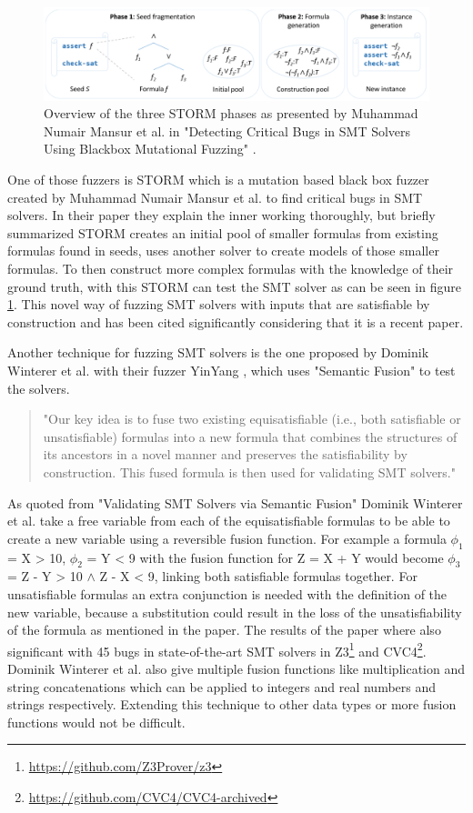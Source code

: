 \begin{figure}
	\centering
	\includegraphics[width=1.0\textwidth]{images/STORM}
	\caption{Overview of the three STORM phases as presented by Muhammad Numair Mansur et al. in "Detecting Critical Bugs in SMT Solvers Using Blackbox Mutational Fuzzing" \cite{1mansur2020detecting}.}
	\label{fig:STORM}
\end{figure}
One of those fuzzers is STORM which is a mutation based black box fuzzer created by Muhammad Numair Mansur et al. \cite{1mansur2020detecting} to find critical bugs in SMT solvers. In their paper they explain the inner working thoroughly, but briefly summarized STORM creates an initial pool of smaller formulas from existing formulas found in seeds, uses another solver to create models of those smaller formulas. To then construct more complex formulas with the knowledge of their ground truth, with this STORM can test the SMT solver as can be seen in figure \ref{fig:STORM}. This novel way of fuzzing SMT solvers with inputs that are satisfiable by construction and has been cited significantly considering that it is a recent paper.


Another technique for fuzzing SMT solvers is the one proposed by Dominik Winterer et al. with their fuzzer YinYang \cite{43YinYang}, which uses "Semantic Fusion" to test the solvers.
\begin{quote}
	\label{quote:Fuzzing:YinYang}
	"Our key idea is to fuse two existing equisatisfiable (i.e., both satisfiable or unsatisfiable) formulas into a new formula that combines the structures of its ancestors in a novel manner and preserves the satisfiability by construction. This fused formula is then used for validating SMT solvers."
\end{quote} As quoted from "Validating SMT Solvers via Semantic Fusion" \cite{43YinYang}
Dominik Winterer et al. take a free variable from each of the equisatisfiable formulas to be able to create a new variable using a reversible fusion function. For example a formula $\phi_1$ = X > 10, $\phi_2$ = Y < 9 with the fusion function for Z = X + Y would become $\phi_3$ = Z - Y > 10 $\land$ Z - X < 9, linking both satisfiable formulas together. For unsatisfiable formulas an extra conjunction is needed with the definition of the new variable, because a substitution could result in the loss of the unsatisfiability of the formula as mentioned in the paper. The results of the paper where also significant with 45 bugs in state-of-the-art SMT solvers in Z3\footnote{\url{https://github.com/Z3Prover/z3}} and CVC4\footnote{\url{https://github.com/CVC4/CVC4-archived}}. Dominik Winterer et al. also give multiple fusion functions like multiplication and string concatenations which can be applied to integers and real numbers and strings respectively. Extending this technique to other data types or more fusion functions would not be difficult.


